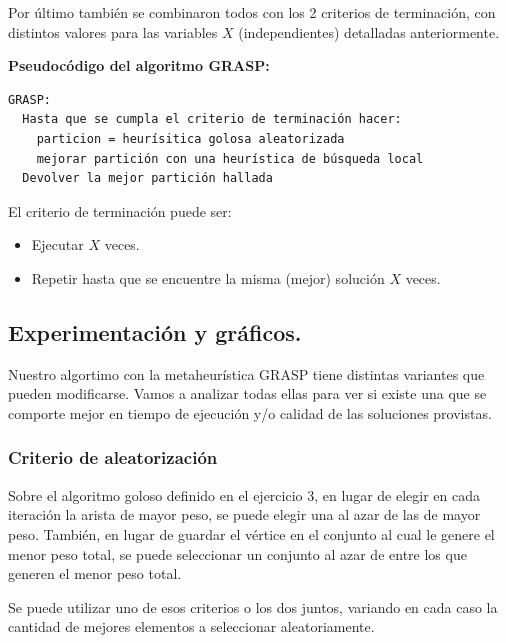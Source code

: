 Por último también se combinaron todos con los 2 criterios de terminación, con distintos valores para las variables $X$ (independientes) detalladas anteriormente.

\vspace*{0.35cm}

\textbf{Pseudocódigo del algoritmo GRASP:}

\vspace*{0.1cm}

\begin{verbatim}
GRASP:
  Hasta que se cumpla el criterio de terminación hacer:
    particion = heurísitica golosa aleatorizada
    mejorar partición con una heurística de búsqueda local
  Devolver la mejor partición hallada
\end{verbatim}

El criterio de terminación puede ser:
\begin{itemize}
  \item Ejecutar $X$ veces.
  \item Repetir hasta que se encuentre la misma (mejor) solución $X$ veces.
\end{itemize}

\newpage
\subsection{Experimentación y gráficos.}
\vspace*{0.3cm}

Nuestro algortimo con la metaheurística GRASP tiene distintas variantes que
pueden modificarse. Vamos a analizar todas ellas para ver si existe una que
se comporte mejor en tiempo de ejecución y/o calidad de las soluciones
provistas.

\subsubsection{Criterio de aleatorización}

Sobre el algoritmo goloso definido en el ejercicio 3, en lugar de elegir en cada
iteración la arista de mayor peso, se puede elegir una al azar de las de mayor
peso. También, en lugar de guardar el vértice en el conjunto al cual le genere
el menor peso total, se puede seleccionar un conjunto al azar de entre los que
generen el menor peso total.

Se puede utilizar uno de esos criterios o los dos juntos, variando en cada
caso la cantidad de mejores elementos a seleccionar aleatoriamente.

